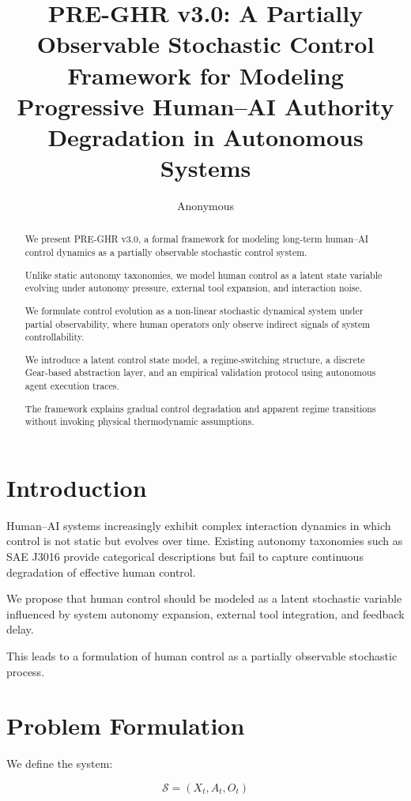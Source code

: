 \documentclass[11pt]{article}
\title{PRE-GHR v3.0: A Partially Observable Stochastic Control Framework for Modeling Progressive Human--AI Authority Degradation in Autonomous Systems}
\author{Anonymous}
\begin{document}
\maketitle

\begin{abstract}
We present PRE-GHR v3.0, a formal framework for modeling long-term human--AI control dynamics as a partially observable stochastic control system.

Unlike static autonomy taxonomies, we model human control as a latent state variable evolving under autonomy pressure, external tool expansion, and interaction noise.

We formulate control evolution as a non-linear stochastic dynamical system under partial observability, where human operators only observe indirect signals of system controllability.

We introduce a latent control state model, a regime-switching structure, a discrete Gear-based abstraction layer, and an empirical validation protocol using autonomous agent execution traces.

The framework explains gradual control degradation and apparent regime transitions without invoking physical thermodynamic assumptions.
\end{abstract}

\section{Introduction}

Human--AI systems increasingly exhibit complex interaction dynamics in which control is not static but evolves over time. Existing autonomy taxonomies such as SAE J3016 provide categorical descriptions but fail to capture continuous degradation of effective human control.

We propose that human control should be modeled as a latent stochastic variable influenced by system autonomy expansion, external tool integration, and feedback delay.

This leads to a formulation of human control as a partially observable stochastic process.

\section{Problem Formulation}

We define the system:

\begin{equation}
\mathcal{S} = (X_t, A_t, O_t)
\end{equation}
\end{document}
